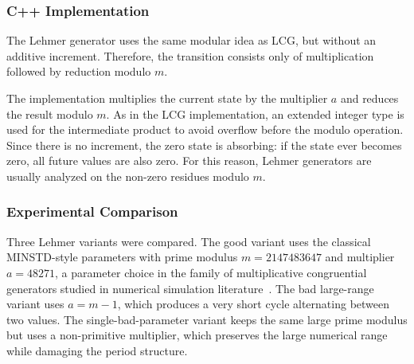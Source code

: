\subsubsection{C++ Implementation}

The Lehmer generator uses the same modular idea as LCG, but without an additive increment. Therefore, the transition consists only of multiplication followed by reduction modulo $m$.


The implementation multiplies the current state by the multiplier $a$ and reduces the result modulo $m$. As in the LCG implementation, an extended integer type is used for the intermediate product to avoid overflow before the modulo operation. Since there is no increment, the zero state is absorbing: if the state ever becomes zero, all future values are also zero. For this reason, Lehmer generators are usually analyzed on the non-zero residues modulo $m$.

\subsubsection{Experimental Comparison}

Three Lehmer variants were compared. The good variant uses the classical MINSTD-style parameters with prime modulus $m=2147483647$ and multiplier $a=48271$, a parameter choice in the family of multiplicative congruential generators studied in numerical simulation literature~\cite{lecuyer1999tables}. The bad large-range variant uses $a=m-1$, which produces a very short cycle alternating between two values. The single-bad-parameter variant keeps the same large prime modulus but uses a non-primitive multiplier, which preserves the large numerical range while damaging the period structure.

\begin{table}[htbp]
\centering
\small
{}
\caption{Lehmer parameter sets used in the experiment}
\label{tab:lehmer-parameters}
\end{table}


